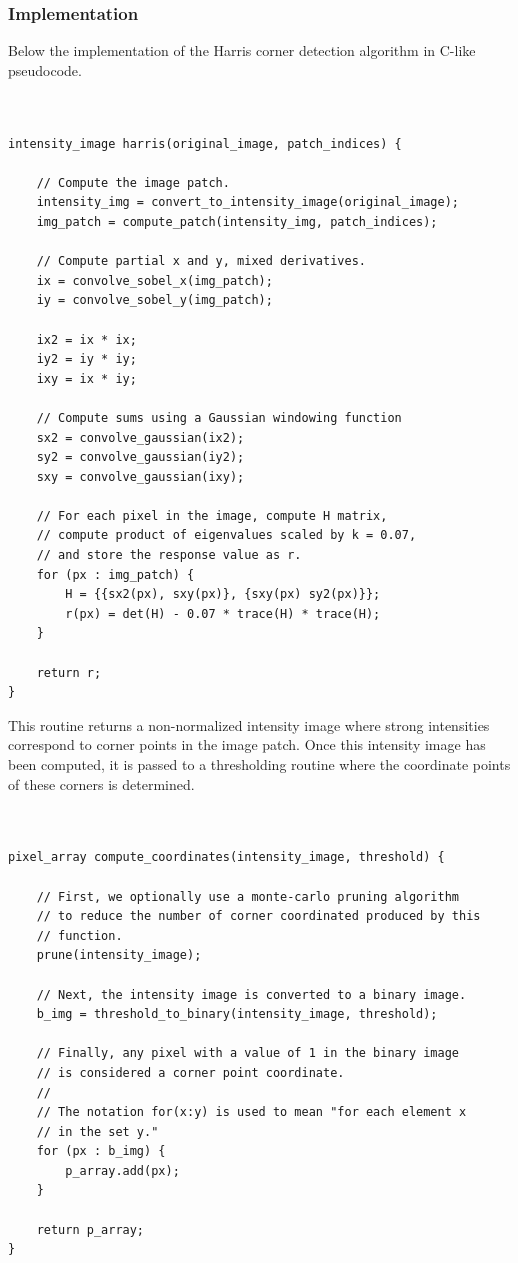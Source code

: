 \documentclass{article}
\begin{document}
\subsubsection{Implementation}
Below the implementation of the Harris corner detection algorithm in C-like pseudocode.
\\~\\
\begin{minipage}{\textwidth}
\begin{lstlisting}

intensity_image harris(original_image, patch_indices) {

	// Compute the image patch.
	intensity_img = convert_to_intensity_image(original_image);
	img_patch = compute_patch(intensity_img, patch_indices);
	
	// Compute partial x and y, mixed derivatives.
	ix = convolve_sobel_x(img_patch);
	iy = convolve_sobel_y(img_patch);
	
	ix2 = ix * ix;
	iy2 = iy * iy;
	ixy = ix * iy;

	// Compute sums using a Gaussian windowing function
	sx2 = convolve_gaussian(ix2);
	sy2 = convolve_gaussian(iy2);
	sxy = convolve_gaussian(ixy);
	
	// For each pixel in the image, compute H matrix,
	// compute product of eigenvalues scaled by k = 0.07,
	// and store the response value as r.
	for (px : img_patch) {
		H = {{sx2(px), sxy(px)}, {sxy(px) sy2(px)}};
		r(px) = det(H) - 0.07 * trace(H) * trace(H);
	}
	
	return r;
}

\end{lstlisting}
\end{minipage}

This routine returns a non-normalized intensity image where strong intensities correspond to corner points in the image patch.  Once this intensity image has been computed, it is passed to a thresholding routine where the coordinate points of these corners is determined.
\\~\\
\begin{minipage}{\textwidth}
\begin{lstlisting}

pixel_array compute_coordinates(intensity_image, threshold) {

	// First, we optionally use a monte-carlo pruning algorithm
	// to reduce the number of corner coordinated produced by this
	// function.
	prune(intensity_image);

	// Next, the intensity image is converted to a binary image.
	b_img = threshold_to_binary(intensity_image, threshold);
	
	// Finally, any pixel with a value of 1 in the binary image
	// is considered a corner point coordinate.
	// 
	// The notation for(x:y) is used to mean "for each element x
	// in the set y."
	for (px : b_img) {
		p_array.add(px);
	}
	
	return p_array;
}

\end{lstlisting}
\end{minipage}
\end{document}
